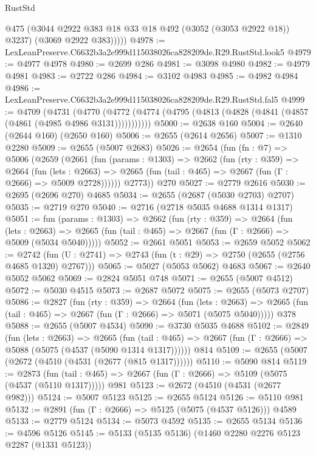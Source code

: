 \begin{lexlean}{RustStd}
\begin{coremodule}
            @475
            (@3044 @2922 @383 @18 @33 @18 @492 (@3052 (@3053 @2922 @18)) @3237)
            (@3069 @2922 @383)))))
@4978 := LexLeanPreserve.C6632b3a2e999d115038026ca828209de.R29.RustStd.look5
@4979 := @4977 @4978
@4980 := @2699 @286
@4981 := @3098 @4980
@4982 := @4979 @4981
@4983 := @2722 @286
@4984 := @3102 @4983
@4985 := @4982 @4984
@4986 := LexLeanPreserve.C6632b3a2e999d115038026ca828209de.R29.RustStd.fal5
@4999 := @4709
    (@4731
      (@4770 (@4772 (@4774 (@4795 (@4813 (@4828 (@4841 (@4857 (@4861 (@4985 @4986 @3131)))))))))))
@5000 := @2638 @160
@5004 := @2640 (@2644 @160) (@2650 @160)
@5006 := @2655 (@2614 @2656)
@5007 := @1310 @2280
@5009 := @2655 (@5007 @2683)
@5026 := @2654
    (fun (fn : @7) =>
    @5006
      (@2659
        (@2661
          (fun (params : @1303) =>
          @2662
            (fun (rty : @359) =>
            @2664
              (fun (lets : @2663) =>
              @2665 (fun (tail : @465) => @2667 (fun (Γ : @2666) => @5009 @2728))))))
        @2773))
    @270
@5027 := @2779 @2616
@5030 := @2695 (@2696 @270) @4685
@5034 := @2655 (@2687 (@5030 @2703) @2707)
@5035 := @2719 @270
@5040 := @2716 (@2718 @5035 @4688 @1314 @1317)
@5051 := fun (params : @1303) =>
  @2662
    (fun (rty : @359) =>
    @2664
      (fun (lets : @2663) =>
      @2665 (fun (tail : @465) => @2667 (fun (Γ : @2666) => @5009 (@5034 @5040)))))
@5052 := @2661 @5051
@5053 := @2659 @5052
@5062 := @2742 (fun (U : @2741) => @2743 (fun (t : @29) => @2750 (@2655 (@2756 @4685 @1320) @2767)))
@5065 := @5027 (@5053 @5062) @4683
@5067 := @2640 @5052 @5062
@5069 := @2824 @5051 @748
@5071 := @2655 (@5007 @4512)
@5072 := @5030 @4515
@5073 := @2687 @5072
@5075 := @2655 (@5073 @2707)
@5086 := @2827
    (fun (rty : @359) =>
    @2664
      (fun (lets : @2663) =>
      @2665 (fun (tail : @465) => @2667 (fun (Γ : @2666) => @5071 (@5075 @5040)))))
    @378
@5088 := @2655 (@5007 @4534)
@5090 := @3730 @5035 @4688
@5102 := @2849
    (fun (lets : @2663) =>
    @2665
      (fun (tail : @465) => @2667 (fun (Γ : @2666) => @5088 (@5075 (@4537 (@5090 @1314 @1317))))))
    @814
@5109 := @2655 (@5007 (@2672 (@4510 (@4531 (@2677 (@815 @1317))))))
@5110 := @5090 @814
@5119 := @2873
    (fun (tail : @465) => @2667 (fun (Γ : @2666) => @5109 (@5075 (@4537 (@5110 @1317)))))
    @981
@5123 := @2672 (@4510 (@4531 (@2677 @982)))
@5124 := @5007 @5123
@5125 := @2655 @5124
@5126 := @5110 @981
@5132 := @2891 (fun (Γ : @2666) => @5125 (@5075 (@4537 @5126))) @4589
@5133 := @2779 @5124
@5134 := @5073 @4592
@5135 := @2655 @5134
@5136 := @4596 @5126
@5145 := @5133 (@5135 @5136) (@1460 @2280 @2276 @5123 @2287 (@1331 @5123))

\end{coremodule}
\end{lexlean}
